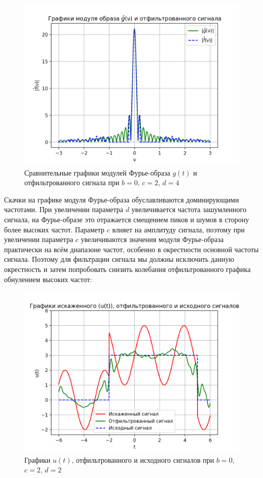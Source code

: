 \begin{figure}[ht!]
    \centering
    \includegraphics[scale=0.55]{media/1 task/specific_freq/Fourier_Image_Comparison_0_2_4_-1,0_-0,22_-2,99_-2,7.png}
    \caption{Сравнительные графики модулей Фурье-образа $g(t)$ и отфильтрованного сигнала при  $b=0$,  $c=2$,  $d=4$}
    \label{fig:fourc_0_2_4}
\end{figure}

Скачки на графике модуля Фурье-образа обуславливаются доминирующими частотами. При увеличении параметра $d$ увеличивается частота зашумленного сигнала, на Фурье-образе это отражается смещением пиков и шумов в сторону более высоких частот. Параметр $c$ влияет на амплитуду сигнала, поэтому при увеличении параметра $c$ увеличиваются значения модуля Фурье-образа практически на всём диапазоне частот, особенно в окрестности основной частоты сигнала. Поэтому для фильтрации сигнала мы должны исключить данную окрестность и затем попробовать снизить колебания отфильтрованного графика обнулением высоких частот: 

\begin{figure}[ht!]
    \centering
    \includegraphics[scale=0.75]{media/1 task/specific_freq/Cleaned_0_2_2_-1,0_-0,22_-2,99_-2,7.png}
    \caption{Графики  $u(t)$, отфильтрованного и исходного сигналов при $b=0$,  $c=2$,  $d=2$}
    \label{fig:cleaned_0_2_2}
\end{figure}

